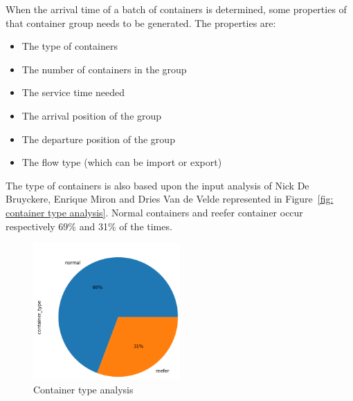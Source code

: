 \documentclass[]{article}
\begin{document}
When the arrival time of a batch of containers is determined, some properties
of that container group needs to be generated. The properties are:
\begin{itemize}
	\item The type of containers
	\item The number of containers in the group
	\item The service time needed
	\item The arrival position of the group
	\item The departure position of the group
	\item The flow type (which can be import or export)
\end{itemize}

The type of containers is also based upon the input analysis of Nick De
Bruyckere, Enrique Miron and Dries Van de Velde represented in Figure~\ref{fig:
	container type analysis}. Normal containers and reefer container occur
respectively 69\% and 31\% of the times.
\begin{figure}
	\centering
	\includegraphics[width=0.5\textwidth]{Afbeeldingen/container_type.png}
	\caption{Container type analysis}
	\label{fig:container type analysis}
\end{figure}
\end{document}
